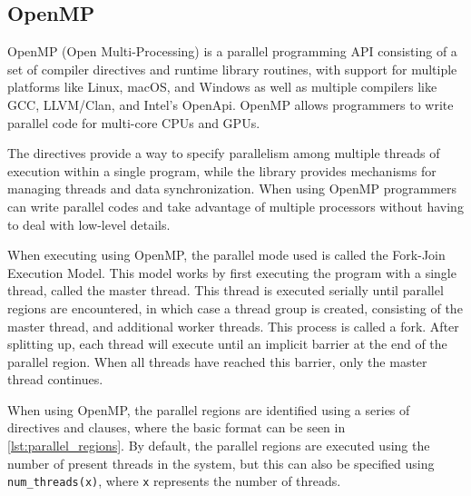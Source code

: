 \subsection{OpenMP}\label{subsec:openmp}

OpenMP (Open Multi-Processing) is a parallel programming API consisting of a set of compiler directives and runtime library routines, with support for multiple platforms like Linux, macOS, and Windows as well as multiple compilers like GCC, LLVM/Clan, and Intel's OpenApi. OpenMP allows programmers to write parallel code for multi-core CPUs and GPUs.\cite{openmp}


The directives provide a way to specify parallelism among multiple threads of execution within a single program, while the library provides mechanisms for managing threads and data synchronization. When using OpenMP programmers can write parallel codes and take advantage of multiple processors without having to deal with low-level details.\cite{openmp}


When executing using OpenMP, the parallel mode used is called the Fork-Join Execution Model. This model works by first executing the program with a single thread, called the master thread. This thread is executed serially until parallel regions are encountered, in which case a thread group is created, consisting of the master thread, and additional worker threads. This process is called a fork. After splitting up, each thread will execute until an implicit barrier at the end of the parallel region. When all threads have reached this barrier, only the master thread continues.\cite{openmp}



When using OpenMP, the parallel regions are identified using a series of directives and clauses, where the basic format can be seen in \cref{lst:parallel_regions}. By default, the parallel regions are executed using the number of present threads in the system, but this can also be specified using \texttt{num\_threads(x)}, where \texttt{x} represents the number of threads.\cite{openmp}

